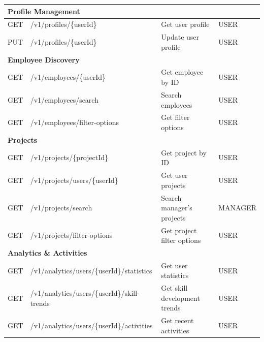 \begin{table}[H]
\begin{tabularx}{\textwidth}{|l|l|X|l|}
\multicolumn{4}{|l|}{\cellcolor{EDAGDunkelgrau!10}\textbf{Profile Management}} \\
\hline
GET & /v1/profiles/\{userId\} & Get user profile & USER \\
\hline
PUT & /v1/profiles/\{userId\} & Update user profile & USER \\
\hline

\multicolumn{4}{|l|}{\cellcolor{EDAGDunkelgrau!10}\textbf{Employee Discovery}} \\
\hline
GET & /v1/employees/\{userId\} & Get employee by ID & USER \\
\hline
GET & /v1/employees/search & Search employees & USER \\
\hline
GET & /v1/employees/filter-options & Get filter options & USER \\
\hline

\multicolumn{4}{|l|}{\cellcolor{EDAGDunkelgrau!10}\textbf{Projects}} \\
\hline
GET & /v1/projects/\{projectId\} & Get project by ID & USER \\
\hline
GET & /v1/projects/users/\{userId\} & Get user projects & USER \\
\hline
GET & /v1/projects/search & Search manager's projects & MANAGER \\
\hline
GET & /v1/projects/filter-options & Get project filter options & USER \\
\hline

\multicolumn{4}{|l|}{\cellcolor{EDAGDunkelgrau!10}\textbf{Analytics \& Activities}} \\
\hline
GET & /v1/analytics/users/\{userId\}/statistics & Get user statistics & USER \\
\hline
GET & /v1/analytics/users/\{userId\}/skill-trends & Get skill development trends & USER \\
\hline
GET & /v1/analytics/users/\{userId\}/activities & Get recent activities & USER \\
\hline


\end{tabularx}
\end{table}
